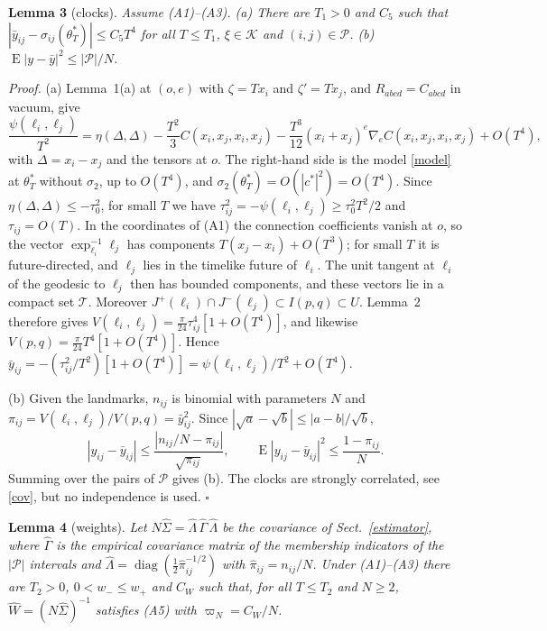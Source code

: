 \medskip
\noindent\textbf{Lemma 3} (clocks). \emph{Assume (A1)--(A3). (a) There are
$T_1>0$ and $C_5$ such that $|\bar y_{ij}-\sigma_{ij}(\theta^*_T)|\le
C_5T^4$ for all $T\le T_1$, $\xi\in\mathcal K$ and $(i,j)\in\mathcal P$.
(b) $\operatorname{E}|y-\bar y|^2\le|\mathcal P|/N$.}

\noindent\emph{Proof.} (a) Lemma~1(a) at $(o,e)$ with $\zeta=Tx_i$ and
$\zeta'=Tx_j$, and $R_{abcd}=C_{abcd}$ in vacuum, give
\begin{equation}
 \frac{\psi(\ell_i,\ell_j)}{T^2}=\eta(\Delta,\Delta)
 -\frac{T^2}3C(x_i,x_j,x_i,x_j)
 -\frac{T^3}{12}(x_i+x_j)^e\nabla_eC(x_i,x_j,x_i,x_j)+O(T^4),
\end{equation}
with $\Delta=x_i-x_j$ and the tensors at $o$. The right-hand side is the
model \eqref{model} at $\theta^*_T$ without $\sigma_2$, up to $O(T^4)$, and
$\sigma_2(\theta^*_T)=O(|c^*|^2)=O(T^4)$. Since
$\eta(\Delta,\Delta)\le-\tau_0^2$, for small $T$ we have
$\tau_{ij}^2=-\psi(\ell_i,\ell_j)\ge\tau_0^2T^2/2$ and $\tau_{ij}=O(T)$. In
the coordinates of (A1) the connection coefficients vanish at $o$, so the
vector $\exp_{\ell_i}^{-1}\ell_j$ has components $T(x_j-x_i)+O(T^3)$; for
small $T$ it is future-directed, and $\ell_j$ lies in the timelike future
of $\ell_i$. The unit tangent at $\ell_i$ of the geodesic to $\ell_j$ then
has bounded components, and these vectors lie in a compact set $\mathcal T$.
Moreover $J^+(\ell_i)\cap J^-(\ell_j)\subset I(p,q)\subset U$. Lemma~2
therefore gives $V(\ell_i,\ell_j)=\tfrac{\pi}{24}\tau_{ij}^4[1+O(T^4)]$, and
likewise $V(p,q)=\tfrac{\pi}{24}T^4[1+O(T^4)]$. Hence
$\bar y_{ij}=-(\tau_{ij}^2/T^2)[1+O(T^4)]=\psi(\ell_i,\ell_j)/T^2+O(T^4)$.

(b) Given the landmarks, $n_{ij}$ is binomial with parameters $N$ and
$\pi_{ij}=V(\ell_i,\ell_j)/V(p,q)=\bar y_{ij}^2$. Since
$|\sqrt a-\sqrt b|\le|a-b|/\sqrt b$,
\begin{equation}
 |y_{ij}-\bar y_{ij}|\le\frac{|n_{ij}/N-\pi_{ij}|}{\sqrt{\pi_{ij}}},
 \qquad\operatorname{E}|y_{ij}-\bar y_{ij}|^2\le\frac{1-\pi_{ij}}N .
\end{equation}
Summing over the pairs of $\mathcal P$ gives (b). The clocks are strongly
correlated, see \eqref{cov}, but no independence is used. \hfill$\square$

\medskip
\noindent\textbf{Lemma 4} (weights). \emph{Let $N\widehat\Sigma=\widehat
\Lambda\,\widehat\Gamma\,\widehat\Lambda$ be the covariance of
Sect.~\ref{estimator}, where $\widehat\Gamma$ is the empirical covariance
matrix of the membership indicators of the $|\mathcal P|$ intervals and
$\widehat\Lambda=\operatorname{diag}(\tfrac12\hat\pi_{ij}^{-1/2})$ with
$\hat\pi_{ij}=n_{ij}/N$. Under (A1)--(A3) there are $T_2>0$,
$0<w_-\le w_+$ and $C_W$ such that, for all $T\le T_2$ and $N\ge2$,
$\widehat W=(N\widehat\Sigma)^{-1}$ satisfies (A5) with $\varpi_N=C_W/N$.}

